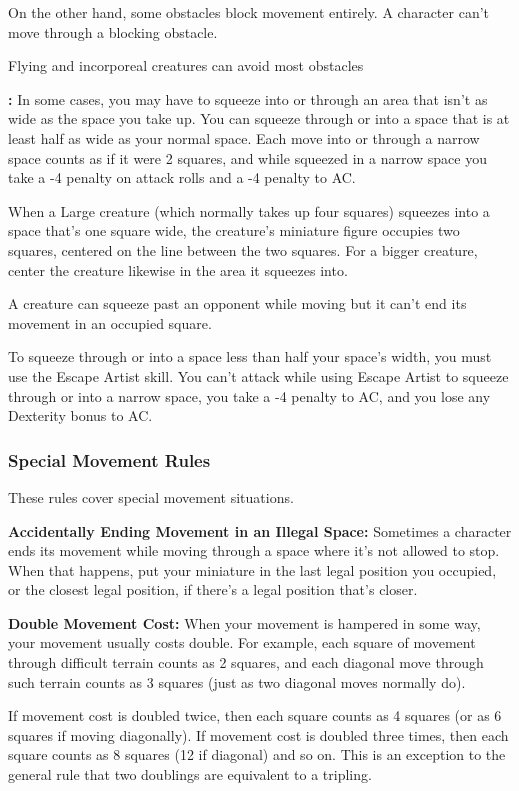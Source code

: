 On the other hand, some obstacles block movement entirely. A character can't move 
through a blocking obstacle.

Flying and incorporeal creatures can avoid most obstacles

\textbf{:} In some cases, you may have to squeeze into or through an area 
that isn't as wide as the space you take up. You can squeeze through or into a 
space that is at least half as wide as your normal space. Each move into or through 
a narrow space counts as if it were 2 squares, and while squeezed in a narrow space 
you take a -4 penalty on attack rolls and a -4 penalty to AC.

When a Large creature (which normally takes up four squares) squeezes into a space 
that's one square wide, the creature's miniature figure occupies two squares, centered 
on the line between the two squares. For a bigger creature, center the creature 
likewise in the area it squeezes into.

A creature can squeeze past an opponent while moving but it can't end its movement 
in an occupied square.

To squeeze through or into a space less than half your space's width, you must 
use the Escape Artist skill. You can't attack while using Escape Artist to squeeze 
through or into a narrow space, you take a -4 penalty to AC, and you lose any Dexterity 
bonus to AC.

\subsubsection{Special Movement Rules}

These rules cover special movement situations.

\textbf{Accidentally Ending Movement in an Illegal Space:} Sometimes a character 
ends its movement while moving through a space where it's not allowed to stop. 
When that happens, put your miniature in the last legal position you occupied, 
or the closest legal position, if there's a legal position that's closer.

\textbf{Double Movement Cost:} When your movement is hampered in some way, your 
movement usually costs double. For example, each square of movement through difficult 
terrain counts as 2 squares, and each diagonal move through such terrain counts 
as 3 squares (just as two diagonal moves normally do).

If movement cost is doubled twice, then each square counts as 4 squares (or as 
6 squares if moving diagonally). If movement cost is doubled three times, then 
each square counts as 8 squares (12 if diagonal) and so on. This is an exception 
to the general rule that two doublings are equivalent to a tripling.

